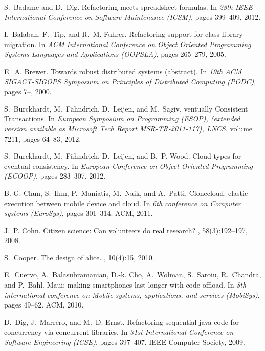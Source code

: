 \documentclass[article]{sigplanconf}
\begin{document}
\begin{thebibliography}{10}

S.~Badame and D.~Dig.
\newblock Refactoring meets spreadsheet formulas. 
\newblock In {\em 28th IEEE International Conference on Software Maintenance
  (ICSM)}, pages 399--409, 2012. 

I.~Balaban, F.~Tip, and R.~M. Fuhrer.
\newblock Refactoring support for class library migration.
\newblock In {\em ACM International Conference on Object Oriented Programming
  Systems Languages and Applications (OOPSLA)}, pages 265--279, 2005.

E.~A. Brewer.
\newblock Towards robust distributed systems (abstract).
\newblock In {\em 19th ACM SIGACT-SIGOPS Symposium on Principles of Distributed
  Computing (PODC)}, pages 7--, 2000.

S.~Burckhardt, M.~F\"ahndrich, D.~Leijen, and M.~Sagiv.
ventually {C}onsistent {T}ransactions.
\newblock In {\em European Symposium on Programming (ESOP), (extended version
  available as Microsoft Tech Report MSR-TR-2011-117), \textrm{LNCS}}, volume
  7211, pages 64--83, 2012.

S.~Burckhardt, M.~F{\"a}hndrich, D.~Leijen, and B.~P. Wood.
\newblock Cloud types for eventual consistency.
\newblock In {\em European Conference on Object-Oriented Programming (ECOOP)},
  pages 283--307. 2012.

B.-G. Chun, S.~Ihm, P.~Maniatis, M.~Naik, and A.~Patti.
\newblock Clonecloud: elastic execution between mobile device and cloud.
\newblock In {\em 6th conference on Computer systems (EuroSys)}, pages
  301--314. ACM, 2011.

J.~P. Cohn.
\newblock Citizen science: Can volunteers do real research?
, 58(3):192--197, 2008.

S.~Cooper.
\newblock The design of alice.
, 10(4):15, 2010.

E.~Cuervo, A.~Balasubramanian, D.-k. Cho, A.~Wolman, S.~Saroiu, R.~Chandra, and
  P.~Bahl.
\newblock Maui: making smartphones last longer with code offload.
\newblock In {\em 8th international conference on Mobile systems, applications,
  and services (MobiSys)}, pages 49--62. ACM, 2010.

D.~Dig, J.~Marrero, and M.~D. Ernst.
\newblock Refactoring sequential java code for concurrency via concurrent
  libraries.
\newblock In {\em 31st International Conference on Software Engineering
  (ICSE)}, pages 397--407. IEEE Computer Society, 2009.


\end{thebibliography}
\end{document}
